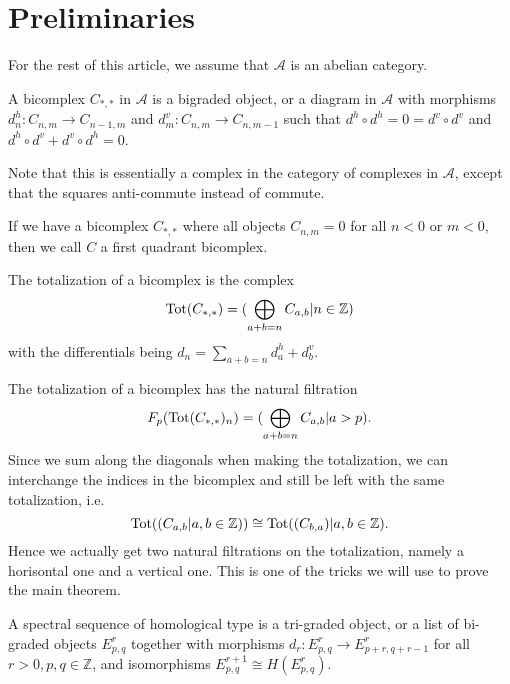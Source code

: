 
\section{Preliminaries}

For the rest of this article, we assume that $\mathcal{A}$ is an abelian category. 

\begin{definition}[Bicomplex]
A bicomplex $C_{*,*}$ in $\mathcal{A}$ is a bigraded object, or a diagram in $\mathcal{A}$ with morphisms 
$d^h_n: C_{n,m}\longrightarrow C_{n-1,m}$ and $d^v_m: C_{n,m}\longrightarrow C_{n,m-1}$ such that $d^h \circ d^h = 0 = d^v \circ d^v$ and $d^h \circ d^v + d^v \circ d^h = 0$.
\end{definition}

Note that this is essentially a complex in the category of complexes in $\mathcal{A}$, except that the squares anti-commute instead of commute.

If we have a bicomplex $C_{*,*}$ where all objects $C_{n,m}=0$ for all $n<0$ or $m<0$, then we call $C$ a first quadrant bicomplex. 


\begin{definition}[Totalization]
The totalization of a bicomplex is the complex
\begin{equation*}
    \operatorname{Tot}(C_{*,*}) = (\bigoplus_{a+b = n}C_{a,b}|n \in \mathbb{Z})
\end{equation*}
with the differentials being $d_n = \sum_{a+b=n} d_a^h + d_b^v$. 
\end{definition}


The totalization of a bicomplex has the natural filtration
\begin{equation*}
    F_p (\operatorname{Tot}(C_{*,*})_n) = (\bigoplus_{a+b = n} C_{a,b}|a>p).
\end{equation*}
Since we sum along the diagonals when making the totalization, we can interchange the indices in the bicomplex and still be left with the same totalization, i.e.
\begin{equation*}
    \operatorname{Tot}((C_{a,b}|a,b \in \mathbb{Z})) \cong \operatorname{Tot}((C_{b,a})|a,b \in \mathbb{Z}).
\end{equation*}
Hence we actually get two natural filtrations on the totalization, namely a horisontal one and a vertical one. This is one of the tricks we will use to prove the main theorem. 


\begin{definition}
A spectral sequence of homological type is a tri-graded object, or a list of bi-graded objects $E_{p,q}^r$ together with morphisms $d_r: E_{p,q}^r \longrightarrow E_{p+r, q+r-1}^r$ for all $r>0, p,q\in \mathbb{Z}$, and isomorphisms $E_{p,q}^{r+1}\cong H(E_{p,q}^{r})$. 
\end{definition}


